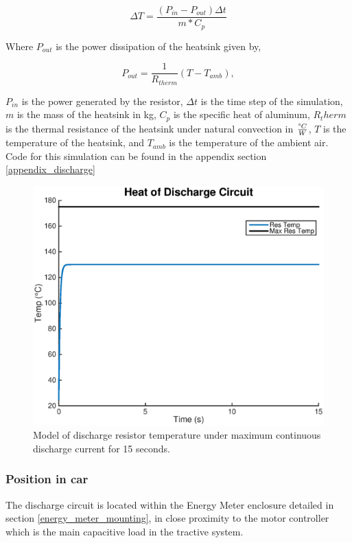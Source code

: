 \documentclass{article}
\begin{document}
\begin{equation}
    \Delta T = \frac{(P_{in} - P_{out}) \Delta t}{m*C_p}
\end{equation}

Where $P_{out}$ is the power dissipation of the heatsink given by, 

\begin{equation}
    P_{out} = \frac{1}{R_{therm}}(T-T_{amb}),
\end{equation}

$P_{in}$ is the power generated by the resistor, $\Delta t$ is the time step of the simulation, $m$ is the mass of the heatsink in kg, $C_p$ is the specific heat of aluminum, $R_therm$ is the thermal resistance of the heatsink under natural convection in $\frac{\degree C}{W}$, $T$ is the temperature of the heatsink, and $T_{amb}$ is the temperature of the ambient air. Code for this simulation can be found in the appendix section \ref{appendix_discharge}




\begin{figure}[H]
    \centering
    \includegraphics[width = 0.7 \textwidth]{discharge_heat_2}
    \caption{Model of discharge resistor temperature under maximum continuous discharge current for 15 seconds.}
    \label{discharge_heat}
\end{figure}



\subsubsection{Position in car}
The discharge circuit is located within the Energy Meter enclosure detailed in section \ref{energy_meter_mounting}, in close proximity to the motor controller which is the main capacitive load in the tractive system. 
\end{document}
